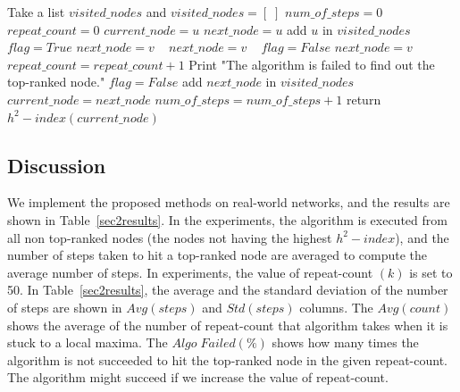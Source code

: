 \documentclass[12pt,3p]{article}
\begin{document}
\begin{algorithm}
\caption{$IndexAndDegreeBasedHillClimbing(G,u,k,maxindex)$}
\label{algo3}
\begin{algorithmic}
\STATE Take a list $visited\_nodes$ and $visited\_nodes = [\;]$
\STATE $num\_of\_steps=0$
\STATE $repeat\_count=0$
\STATE $current\_node=u$
\STATE $next\_node=u$
\STATE add $u$ in $visited\_nodes$
\STATE $flag=True$
\STATE $next\_node=v$
\ENDIF
\ENDFOR\
\STATE $next\_node=v$
\ENDIF
\ENDFOR\
\STATE $flag=False$
\STATE $next\_node=v$
\ENDIF
\ENDFOR\
\STATE $repeat\_count=repeat\_count+1$
\ELSE
\STATE Print "The algorithm is failed to find out the top-ranked node."
\STATE $flag=False$
\ENDIF
\ENDIF
{}
\STATE add $next\_node$ in $visited\_nodes$	
\STATE $current\_node=next\_node$
\STATE $num\_of\_steps=num\_of\_steps+1$
\ENDIF
\ENDWHILE
\STATE return $h^2-index(current\_node)$
\end{algorithmic}
\end{algorithm}



\subsection*{Discussion}

We implement the proposed methods on real-world networks, and the results are shown in Table~\ref{sec2results}. In the experiments, the algorithm is executed from all non top-ranked nodes (the nodes not having the highest $h^2-index$), and the number of steps taken to hit a top-ranked node are averaged to compute the average number of steps. In experiments, the value of repeat-count $(k)$ is set to 50. In Table~\ref{sec2results}, the average and the standard deviation of the number of steps are shown in $Avg(steps)$ and $Std(steps)$ columns. The $Avg(count)$ shows the average of the number of repeat-count that algorithm takes when it is stuck to a local maxima. The $Algo\;Failed(\%)$ shows how many times the algorithm is not succeeded to hit the top-ranked node in the given repeat-count. The algorithm might succeed if we increase the value of repeat-count. %
\end{document}

